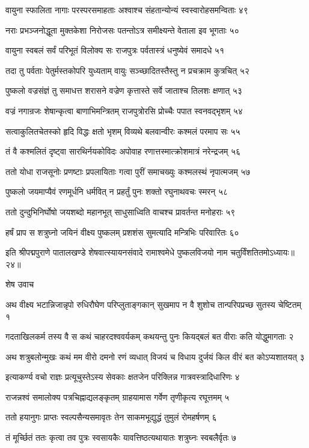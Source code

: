 वायुना स्फालिता नागाः परस्परसमाहताः
अश्वाश्च संहतान्योन्यं स्वस्वारोहसमन्विताः ४९

नराः प्रभञ्जनोद्धूता मुक्तकेशा निरोजसः
पतन्तोऽत्र समीक्ष्यन्ते वेताला इव भूगताः ५०

वायुना स्वबलं सर्वं परिभूतं विलोक्य सः
राजपुत्रः पर्वतास्त्रं धनुष्येवं समादधे ५१

तदा तु पर्वताः पेतुर्मस्तकोपरि युध्यताम्
वायुः सञ्च्छादितस्तैस्तु न प्रचक्राम कुत्रचित् ५२

पुष्कलो वज्रसंज्ञं तु समाधत्त शरासने
वज्रेण कृत्तास्ते सर्वे जाताश्च तिलशः क्षणात् ५३

वज्रं नगान्रजः शेषान्कृत्वा बाणाभिमन्त्रितम्
राजपुत्रोरसि प्रोच्चैः पपात स्वनवद्भृशम् ५४

सत्वाकुलितचेतस्को हृदि विद्धः क्षतो भृशम्
विव्यथे बलवान्वीरः कश्मलं परमाप सः ५५

तं वै कश्मलितं दृष्ट्वा सारथिर्नयकोविदः
अपोवाह रणात्तस्मात्क्रोशमात्रं नरेन्द्रजम् ५६

ततो योधा राजसूनोः प्रणष्टाः प्रपलायिताः
गत्वा पुरीं समाचख्युः कश्मलस्थं नृपात्मजम् ५७

पुष्कलो जयमाप्यैवं रणमूर्धनि धर्मवित्
न प्रहर्तुं पुनः शक्तो रघुनाथवचः स्मरन् ५८

ततो दुन्दुभिनिर्घोषो जयशब्दो महानभूत्
साधुसाध्विति वाचश्च प्रावर्तन्त मनोहराः ५९

हर्षं प्राप स शत्रुघ्नो जयिनं वीक्ष्य पुष्कलम्
प्रशशंस सुमत्यादि मन्त्रिभिः परिवारितः ६०

इति श्रीपद्मपुराणे पातालखण्डे शेषवात्स्यायनसंवादे रामाश्वमेधे पुष्कलविजयो नाम चतुर्विंशतितमोऽध्यायः॥२४॥


शेष उवाच

अथ वीक्ष्य भटान्निजान्नृपो रुधिरौघेण परिप्लुताङ्गकान्
सुखमाप न वै शुशोच तान्परिपप्रच्छ सुतस्य चेष्टितम् १

गदताखिलकर्म तस्य वै स कथं चाहरदश्ववर्यकम्
कथयन्तु पुनः कियद्बलं बत वीराः कति योद्धुमागताः २

अथ शत्रुबलोन्मुखः कथं मम वीरो दमनो रणं व्यधात्
विजयं च विधाय दुर्जयं किल वीरं बत कोऽप्यशातयत् ३

इत्याकर्ण्य वचो राज्ञः प्रत्यूचुस्तेऽस्य सेवकाः
क्षतजेन परिक्लिन्न गात्रवस्त्रादिधारिणः ४

राजन्नश्वं समालोक्य पत्रचिह्नाद्यलङ्कृतम्
ग्राहयामास गर्वेण तृणीकृत्य रघूत्तमम् ५

ततो हयानुगः प्राप्तः स्वल्पसैन्यसमावृतः
तेन साकमभूद्युद्धं तुमुलं रोमहर्षणम् ६

तं मूर्च्छितं ततः कृत्वा तव पुत्रः स्वसायकैः
यावत्तिष्ठत्यथायातः शत्रुघ्नः स्वबलैर्वृतः ७

